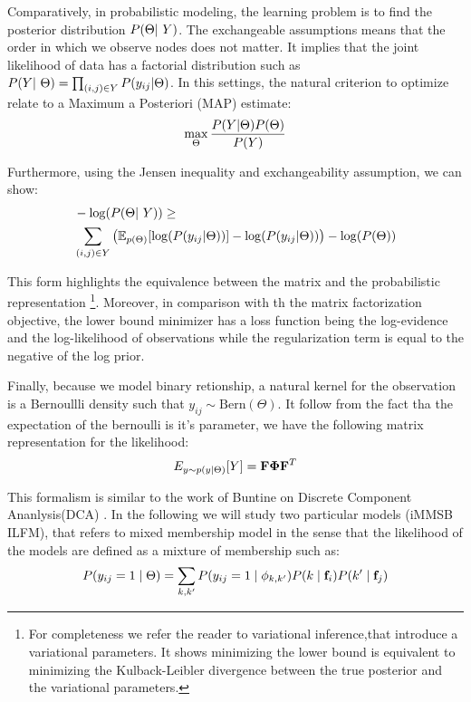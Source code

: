 Comparatively, in probabilistic modeling, the learning problem is to find the posterior distribution $\p(\Theta | Y)$. The exchangeable assumptions means that the order in which we observe nodes does not matter. It implies that the joint likelihood of data has a factorial distribution such as $\p(Y | \Theta) = \prod_{(i,j) \in Y} \p(y_{ij}| \Theta)$. In this settings, the natural criterion to optimize relate to a Maximum a Posteriori (MAP) estimate: 
\begin{displaymath}
    \max\limits_{\Theta}  \frac{P(Y | \Theta) P(\Theta)}{P(Y)}
\end{displaymath}

Furthermore, using the Jensen inequality and exchangeability assumption, we can show:
\begin{align}
    &- \log(\p(\Theta | Y)) \geq \nonumber \\  
    &\sum_{(i,j) \in Y} \left( \E_{p(\Theta)}[\log(\p(y_{ij}|\Theta))] - \log(\p(y_{ij}|\Theta)) \right) - \log(\p(\Theta))
\end{align}	


This form highlights the equivalence between the matrix and the probabilistic representation \footnote{For completeness we refer the reader to variational inference,that introduce a variational parameters. It shows minimizing the lower bound is equivalent to minimizing the Kulback-Leibler divergence between the true posterior and the variational parameters.}. Moreover, in comparison with th  the matrix factorization objective, the lower bound minimizer has a loss function being the log-evidence and the log-likelihood of observations while the regularization term is equal to the negative of the log prior.


Finally, because we model binary retionship, a natural kernel for the observation is a Bernoullli density such that $y_{ij} \sim \text{Bern}(\Theta)$. It follow from the fact tha the expectation of the bernoulli is it's parameter, we have the following matrix representation for the likelihood:
\begin{equation}
E_{y \sim p(y \mid \Theta)}[Y] = \mathbf{F} \mathbf{\Phi}  \mathbf{F}^T
\end{equation}

This formalism is similar to the work of Buntine on Discrete Component Ananlysis(DCA) \cite{DCA}. In the following we will study two particular models (iMMSB ILFM), that refers to mixed membership model in the sense that the likelihood of the models are defined as a mixture of membership such as:
\begin{equation}
P(y_{ij}=1 \mid \Theta ) = \sum_{k, k'} P(y_{ij}=1\mid\phi_{k,k'}) P(k \mid \mathbf{f}_i) P(k' \mid \mathbf{f}_j)
\end{equation}

